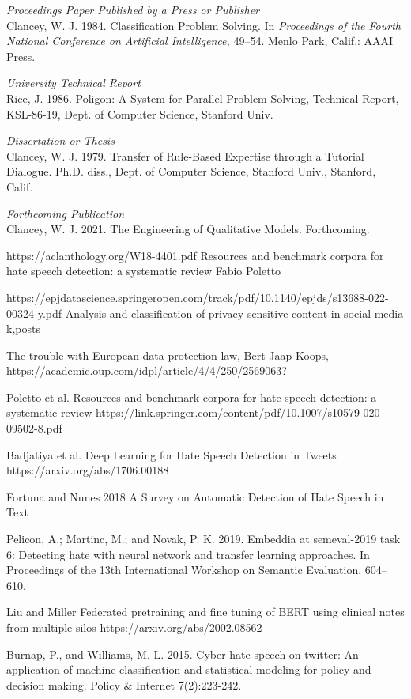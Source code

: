 \documentclass[letterpaper]{article} %
\begin{document}
\smallskip \noindent \textit{Proceedings Paper Published by a Press or Publisher}\\
Clancey, W. J. 1984. Classification Problem Solving. In \textit{Proceedings of the Fourth National Conference on Artificial Intelligence,} 49--54. Menlo Park, Calif.: AAAI Press. 

\smallskip \noindent \textit{University Technical Report}\\
Rice, J. 1986. Poligon: A System for Parallel Problem Solving, Technical Report, KSL-86-19, Dept. of Computer Science, Stanford Univ. 

\smallskip \noindent \textit{Dissertation or Thesis}\\
Clancey, W. J. 1979. Transfer of Rule-Based Expertise through a Tutorial Dialogue. Ph.D. diss., Dept. of Computer Science, Stanford Univ., Stanford, Calif.

\smallskip \noindent \textit{Forthcoming Publication}\\
Clancey, W. J. 2021. The Engineering of Qualitative Models. Forthcoming.

https://aclanthology.org/W18-4401.pdf Resources and benchmark corpora for hate speech detection: a systematic review Fabio Poletto

https://epjdatascience.springeropen.com/track/pdf/10.1140/epjds/s13688-022-00324-y.pdf Analysis and classification of privacy-sensitive content in social media k,posts

The trouble with European data protection law, Bert-Jaap Koops, https://academic.oup.com/idpl/article/4/4/250/2569063?

Poletto et al. Resources and benchmark corpora for hate speech
detection: a systematic review https://link.springer.com/content/pdf/10.1007/s10579-020-09502-8.pdf

Badjatiya et al. Deep Learning for Hate Speech Detection in Tweets https://arxiv.org/abs/1706.00188

Fortuna and Nunes 2018 A Survey on Automatic Detection of Hate Speech in Text

Pelicon, A.; Martinc, M.; and Novak, P. K. 2019. Embeddia at semeval-2019 task 6: Detecting hate with neural network and transfer learning approaches. In Proceedings of the 13th International Workshop on Semantic Evaluation, 604–610.

Liu and Miller Federated pretraining and fine tuning of BERT using clinical notes from multiple silos https://arxiv.org/abs/2002.08562

Burnap, P., and Williams, M. L. 2015. Cyber hate speech on twitter: An application of machine classification and statistical modeling for policy and decision making. Policy \& Internet 7(2):223-242.
\end{document}
